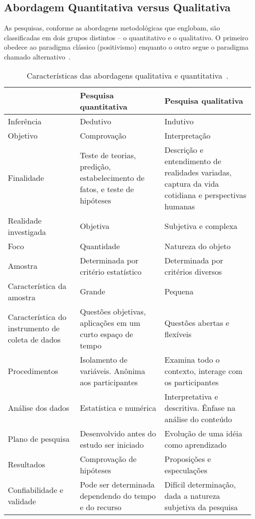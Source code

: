 \subsection{Abordagem Quantitativa versus Qualitativa}

As pesquisas, conforme as abordagens metodológicas que englobam, são classificadas em
dois grupos distintos – o quantitativo e o qualitativo. O primeiro obedece ao paradigma
clássico (positivismo) enquanto o outro segue o paradigma chamado alternativo~\cite{terence2006abordagem}.

\begin{table}[htb]
\center
\footnotesize
\begin{tabular}{|p{4cm}|p{5cm}|p{5cm}|}
  \hline
   \textbf{} & \textbf{Pesquisa quantitativa}  & \textbf{Pesquisa qualitativa}\\
    \hline
   	Inferência & Dedutivo & Indutivo\\
   \hline    
    	Objetivo & Comprovação & Interpretação\\
   \hline
	Finalidade & Teste de teorias, predição, estabelecimento de fatos, e teste de hipóteses & Descrição e entendimento de realidades variadas, captura da vida cotidiana e perspectivas humanas\\
   \hline
	Realidade investigada & Objetiva & Subjetiva e complexa\\
   \hline
	Foco & Quantidade & Natureza do objeto\\
   \hline
	Amostra & Determinada por critério estatístico & Determinada por critérios diversos\\
   \hline
	Característica da amostra & Grande & Pequena\\
   \hline
	Característica do instrumento de coleta de dados & Questões objetivas, aplicações em um curto espaço de tempo & Questões abertas e flexíveis\\
   \hline
	Procedimentos & Isolamento de variáveis. Anônima aos participantes & Examina todo o contexto, interage com os participantes\\
   \hline
	Análise dos dados & Estatística e numérica & Interpretativa e descritiva. Ênfase na análise do conteúdo\\
   \hline
	Plano de pesquisa & Desenvolvido antes do estudo ser iniciado & Evolução de uma idéia como aprendizado\\
   \hline
	Resultados & Comprovação de hipóteses & Proposições e especulações\\
   \hline
	Confiabilidade e validade & Pode ser determinada dependendo do tempo e do recurso & Difícil determinação, dada a natureza subjetiva da pesquisa\\
   \hline
\end{tabular}
\caption{Características das abordagens qualitativa e quantitativa~\cite{terence2006abordagem}.}
\end{table}

